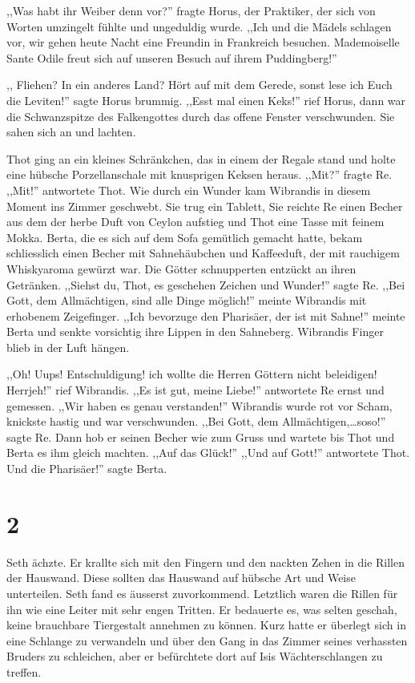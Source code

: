 \documentclass[11pt,titlepage,a5paper]{book}
\begin{document}
,,Was habt ihr Weiber denn vor?'' fragte Horus, der Praktiker, der sich von Worten umzingelt fühlte und ungeduldig wurde. ,,Ich und die Mädels schlagen vor, wir gehen heute Nacht eine Freundin in Frankreich besuchen. Mademoiselle Sante Odile freut sich auf unseren Besuch auf ihrem Puddingberg!'' 

,, Fliehen? In ein anderes Land? Hört auf mit dem Gerede, sonst lese ich Euch die Leviten!'' sagte Horus brummig. ,,Esst mal einen Keks!''  rief Horus, dann war die Schwanzspitze des Falkengottes durch das offene Fenster verschwunden. Sie sahen sich an und lachten.

Thot ging an ein kleines Schränkchen, das in einem der Regale stand und holte eine hübsche Porzellanschale mit knusprigen Keksen heraus. ,,Mit?'' fragte Re. ,,Mit!'' antwortete Thot. Wie durch ein Wunder kam Wibrandis in diesem Moment ins Zimmer geschwebt. Sie trug ein Tablett, Sie reichte Re einen Becher aus dem der herbe Duft von Ceylon aufstieg und Thot eine Tasse mit feinem Mokka. Berta, die es sich auf dem Sofa gemütlich gemacht hatte, bekam schliesslich einen Becher mit Sahnehäubchen und Kaffeeduft, der mit rauchigem Whiskyaroma gewürzt war. Die Götter schnupperten entzückt an ihren Getränken. ,,Siehst du, Thot, es geschehen Zeichen und Wunder!'' sagte Re. ,,Bei Gott, dem Allmächtigen, sind alle Dinge möglich!'' meinte Wibrandis mit erhobenem Zeigefinger. ,,Ich bevorzuge den Pharisäer, der ist mit Sahne!'' meinte Berta und senkte vorsichtig ihre Lippen in den Sahneberg. Wibrandis Finger blieb in der Luft hängen.

,,Oh! Uups! Entschuldigung! ich wollte die Herren Göttern nicht beleidigen! Herrjeh!'' rief Wibrandis. ,,Es ist gut, meine Liebe!'' antwortete Re ernst und gemessen. ,,Wir haben es genau verstanden!'' Wibrandis wurde rot vor Scham, knickste hastig und war verschwunden. ,,Bei Gott, dem Allmächtigen,\dots soso!'' sagte Re. Dann hob er seinen Becher wie zum Gruss und wartete bis Thot und Berta es ihm gleich machten. ,,Auf das Glück!'' ,,Und auf Gott!'' antwortete Thot. Und die Pharisäer!'' sagte Berta.

\section*{2}

Seth ächzte. Er krallte sich mit den Fingern und den nackten Zehen in die Rillen der Hauswand. Diese sollten das Hauswand auf hübsche Art und Weise unterteilen. Seth fand es äusserst zuvorkommend. Letztlich waren die Rillen für ihn wie eine Leiter mit sehr engen Tritten. Er bedauerte es, was selten geschah, keine brauchbare Tiergestalt annehmen zu können. Kurz hatte er überlegt sich in eine Schlange zu verwandeln und über den Gang in das Zimmer seines verhassten Bruders zu schleichen, aber er befürchtete dort auf Isis Wächterschlangen zu treffen.
\end{document}
